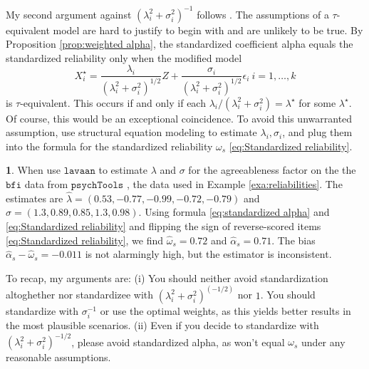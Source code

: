 \documentclass{article}
\theoremstyle{plain}
\theoremstyle{plain}
\theoremstyle{definition}
\theoremstyle{remark}
\theoremstyle{definition}
\newtheorem{example}[thm]{\protect\examplename}
\theoremstyle{plain}
\theoremstyle{plain}
\theoremstyle{definition}
\providecommand{\examplename}{Example}
\renewcommand{\sqrt}[1]{{(#1)^{1/2}}}
\begin{document}
My second argument against $(\lambda_{i}^{2}+\sigma_{i}^{2})^{-1}$
follows \citep{Falk2011-ae}. The assumptions of a $\tau$-equivalent model are hard
to justify to begin with and are unlikely to be true. By Proposition \ref{prop:weighted alpha}, the standardized coefficient alpha equals the standardized reliability only when the modified model
\[
X_{i}^{\star}=\frac{\lambda_{i}}{\sqrt{\lambda_{i}^{2}+\sigma_{i}^{2}}}Z+\frac{\sigma_{i}}{\sqrt{\lambda_{i}^{2}+\sigma_{i}^{2}}}\epsilon_{i}\:i=1,\ldots,k
\]
is $\tau$-equivalent. This occurs if and only if each $\lambda_{i}/(\lambda_{i}^{2}+\sigma_{i}^{2})=\lambda^{\star}$
for some $\lambda^{\star}$. Of course, this would be an exceptional coincidence. To avoid this unwarranted assumption, use structural equation modeling to estimate $\lambda_{i},\sigma_{i}$, and plug them into
the formula for the standardized reliability $\omega_s$ \eqref{eq:Standardized reliability}. 






\begin{example}

When use $\mathtt{lavaan}$ to estimate $\lambda$ and $\sigma$ for the agreeableness factor on the the $\texttt{bfi}$ data from $\texttt{psychTools}$ \citep{Revelle2019-te}, the data used in Example \ref{exa:reliabilities}. The estimates are $\hat{\lambda} = (0.53, -0.77, -0.99, -0.72, -0.79)$ and $\hat{\sigma} = (1.3, 0.89, 0.85, 1.3, 0.98)$. Using formula \eqref{eq:standardized alpha} and \eqref{eq:Standardized reliability} and flipping the sign of reverse-scored items \eqref{eq:Standardized reliability}, we find $\hat{\omega}_s = 0.72$ and $\hat{\alpha}_s = 0.71$. The bias $\hat{\alpha}_s - \hat{\omega}_s = -0.011$ is not alarmingly high, but the estimator is inconsistent. 
\end{example}

To recap, my arguments are: (i) You should neither avoid standardization altoghether nor standardizee with $(\lambda_{i}^{2}+\sigma_{i}^{2})^(-1/2)$ nor $1$. You should standardize with $\sigma_i^{-1}$ or use the optimal weights, as this yields better results in the most plausible scenarios. (ii) Even if you decide to standardize with $(\lambda_{i}^{2}+\sigma_{i}^{2})^{-1/2}$, please avoid standardized alpha, as won't equal $\omega_s$ under any reasonable assumptions.

\end{document}
